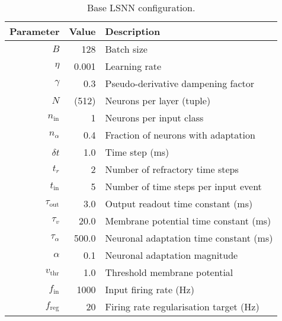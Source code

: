 \documentclass[../../report.tex]{subfiles}
\begin{document}
\begin{table}
  \begin{center}
    \renewcommand{\arraystretch}{1.25}
    \begin{tabular}{ r | r | l }
      Parameter & Value & Description
      \\ \hline
      \(B\) & 128 & Batch size
      \\
      \(\eta\) & 0.001 & Learning rate
      \\
      \(\gamma\) & 0.3 & Pseudo-derivative dampening factor
      \\
      \(N\) & (512) & Neurons per layer (tuple)
      \\
      \(n_\mathrm{in}\) & 1 & Neurons per input class
      \\
      \(n_\alpha\) & 0.4 & Fraction of neurons with adaptation
      \\
      \(\delta t\) & 1.0 & Time step (ms)
      \\
      \(t_r\) & 2 & Number of refractory time steps
      \\
      \(t_\mathrm{in}\) & 5 & Number of time steps per input event
      \\
      \(\tau_\mathrm{out}\) & 3.0 & Output readout time constant (ms)
      \\
      \(\tau_v\) & 20.0 & Membrane potential time constant (ms)
      \\
      \(\tau_\alpha\) & 500.0 & Neuronal adaptation time constant (ms)
      \\
      \(\alpha\) & 0.1 & Neuronal adaptation magnitude
      \\
      \(v_\mathrm{thr}\) & 1.0 & Threshold membrane potential
      \\
      \(f_\mathrm{in}\) & 1000 & Input firing rate (Hz)
      \\
      \(f_\mathrm{reg}\) & 20 & Firing rate regularisation target (Hz)
      \\
    \end{tabular}
  \end{center}
  \caption{Base LSNN configuration.}
  \label{tab:lsnn-base}
\end{table}
\end{document}
